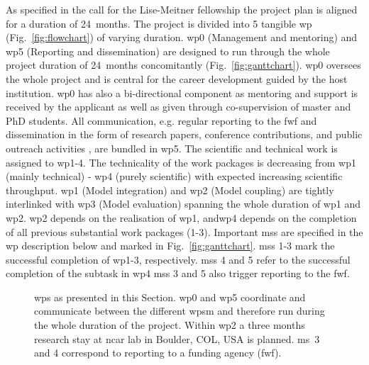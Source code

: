 As specified in the call for the Lise-Meitner fellowship the project plan is aligned for a duration of 24~months. The project is divided into 5 tangible \gls{wp} (Fig.~\ref{fig:flowchart}) of varying duration. \gls{wp}0 (Management and mentoring) and \gls{wp}5 (Reporting and dissemination) are designed to run through the whole project duration of 24~months concomitantly (Fig.~\ref{fig:ganttchart}). \gls{wp}0 oversees the whole project and is central for the career development guided by the host institution. \gls{wp}0 has also a bi-directional component as mentoring and support is received by the applicant as well as given through co-supervision of master and PhD students. All communication, e.g. regular reporting to the \gls{fwf} and dissemination in the form of research papers, conference contributions, and public outreach activities , are bundled in \gls{wp}5. The scientific and technical work is assigned to \gls{wp}1-4. The technicality of the work packages is decreasing from \gls{wp}1 (mainly technical) - \gls{wp}4 (purely scientific) with expected increasing scientific throughput. \gls{wp}1 (Model integration) and \gls{wp}2 (Model coupling) are tightly interlinked with \gls{wp}3 (Model evaluation) spanning the whole duration of \gls{wp}1 and \gls{wp}2. \gls{wp}2 depends on the realisation of \gls{wp}1, and\gls{wp}4 depends on the completion of all previous substantial work packages (1-3). Important \glspl{ms} are specified in the \gls{wp} description below and marked  in Fig.~\ref{fig:ganttchart}. 
\glspl{ms} 1-3 mark the successful completion of \gls{wp}1-3, respectively. \glspl{ms} 4 and 5 refer to the successful completion of the subtask in \gls{wp}4 \glspl{ms} 3 and 5 also trigger reporting to the \gls{fwf}.

\begin{figure}[!ht]
  \centering
  \caption{\glspl{wp} as presented in this Section. \gls{wp}0 and \gls{wp}5 coordinate and communicate between the different \glspl{wp}m and therefore run during the whole duration of the project. Within \gls{wp}2 a three months research stay at \gls{ncar} lab in Boulder, COL, USA is planned. \gls{ms}~3 and 4 correspond to reporting to a funding agency (\gls{fwf}).}
  \vspace{-30pt}
\end{figure}

